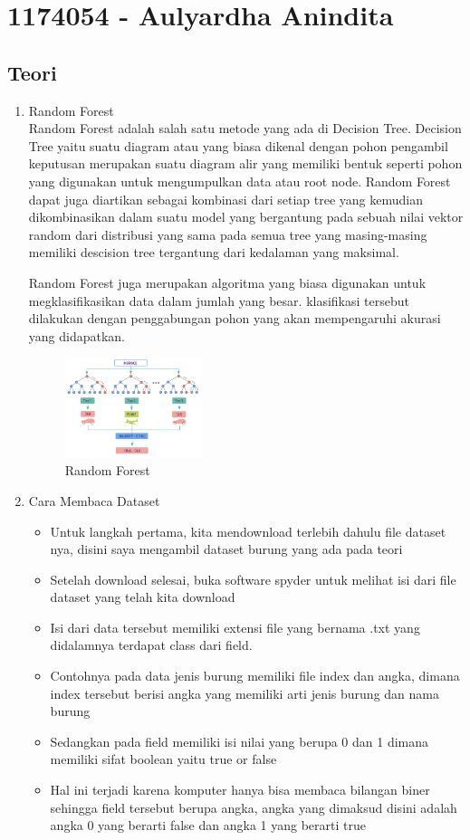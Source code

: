 \section{1174054 - Aulyardha Anindita}

\subsection{Teori}
\begin{enumerate}
\item Random Forest \\
Random Forest adalah salah satu metode yang ada di Decision Tree. Decision Tree yaitu suatu diagram atau yang biasa dikenal dengan pohon pengambil keputusan merupakan suatu diagram alir yang memiliki bentuk seperti pohon yang digunakan untuk mengumpulkan data atau root node. Random Forest dapat juga diartikan sebagai kombinasi dari setiap tree yang kemudian dikombinasikan dalam suatu model yang bergantung pada sebuah nilai vektor random dari distribusi yang sama pada semua tree yang masing-masing memiliki descision tree tergantung dari kedalaman yang maksimal.

Random Forest juga merupakan algoritma yang biasa digunakan untuk megklasifikasikan data dalam jumlah yang besar. klasifikasi tersebut dilakukan dengan penggabungan pohon yang akan mempengaruhi akurasi yang didapatkan.

\begin{figure}[H]
		\includegraphics[width=4cm]{figures/1174054/3/1.png}
		\centering
		\caption{Random Forest}
\end{figure}

\item Cara Membaca Dataset \\
\begin{itemize}
\item Untuk langkah pertama, kita mendownload terlebih dahulu file dataset nya, disini saya mengambil dataset burung yang ada pada teori
\item Setelah download selesai, buka software spyder untuk melihat isi dari file dataset yang telah kita download
\item Isi dari data tersebut memiliki extensi file yang bernama .txt yang didalamnya terdapat class dari field.
\item Contohnya pada data jenis burung memiliki file index dan angka, dimana index tersebut berisi angka yang memiliki arti jenis burung dan nama burung
\item Sedangkan pada field memiliki isi nilai yang berupa 0 dan 1 dimana memiliki sifat boolean yaitu true or false
\item Hal ini terjadi karena komputer hanya bisa membaca bilangan biner sehingga field tersebut berupa angka, angka yang dimaksud disini adalah angka 0 yang berarti false dan angka 1 yang berarti true
\end{itemize}


\end{enumerate}
